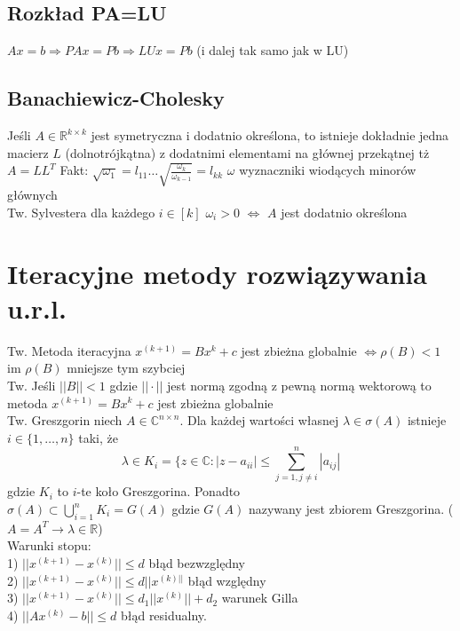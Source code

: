 \documentclass[twocolumn]{article}
\begin{document}
\begin{flushleft}
\subsection{Rozkład PA=LU}
$Ax=b \Rightarrow PAx=Pb \Rightarrow LUx=Pb$ (i dalej tak samo jak w LU)
\subsection{Banachiewicz-Cholesky}
Jeśli $A \in \mathbb{R}^{k\times k}$ jest symetryczna i dodatnio określona, to istnieje dokładnie jedna macierz $L$ (dolnotrójkątna) z dodatnimi elementami na głównej przekątnej tż $A=LL^T$
Fakt: $\sqrt{\omega_1} = l_{11} \ldots \sqrt{\frac{\omega_{k}}{\omega_{k-1}}} = l_{kk}$  $\omega$ wyznaczniki wiodących minorów głównych\\
Tw. Sylvestera dla każdego $i \in [k]$  $\omega_i > 0$ $\Leftrightarrow$ $A$ jest dodatnio określona
\section{Iteracyjne metody rozwiązywania u.r.l.}
Tw. Metoda iteracyjna $x^{(k+1)} = Bx^k + c$ jest zbieżna globalnie $\Leftrightarrow \rho(B) < 1$\\ im $\rho(B)$ mniejsze tym szybciej\\
Tw. Jeśli $||B|| < 1$ gdzie $||\cdot||$ jest normą zgodną z pewną normą wektorową to metoda $x^{(k+1)}=Bx^k+c$ jest zbieżna globalnie\\
Tw. Greszgorin niech $A \in \mathbb{C}^{n \times n}$. Dla każdej wartości własnej $\lambda \in \sigma(A)$ istnieje $i \in \{1,\ldots,n\}$ taki, że
$$\lambda \in K_i = \{z \in \mathbb{C}:|z-a_{ii}| \leq \sum_{j=1,j \neq i}^{n} |a_{ij}|$$
gdzie $K_i$ to $i$-te koło Greszgorina. Ponadto\\
$\sigma(A) \subset \bigcup_{i=1}^nK_i = G(A)$ gdzie $G(A)$ nazywany jest zbiorem Greszgorina. ($A=A^T \rightarrow \lambda \in \mathbb{R}$)\\
Warunki stopu: \\ %
1) $||x^{(k+1)} - x^{(k)}|| \leq d$ błąd bezwzględny \\
2) $||x^{(k+1)} - x^{(k)}|| \leq d||x^{(k)||}$ błąd względny \\
3) $||x^{(k+1)} - x^{(k)}|| \leq d_1||x^{(k)}|| + d_2$ warunek Gilla\\
4) $||Ax^{(k)} -b || \leq d$ błąd residualny. \\


\end{flushleft}
\end{document}
